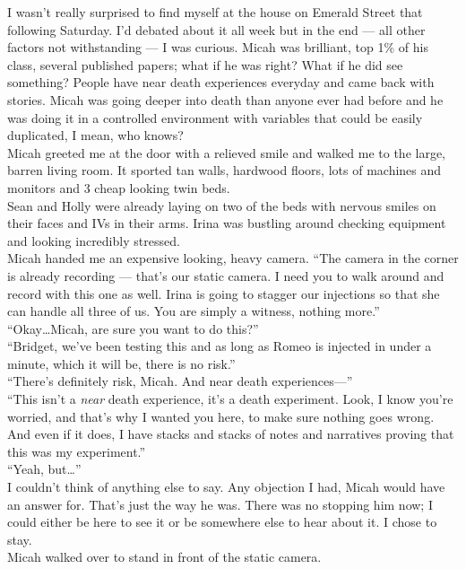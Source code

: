 \documentclass[a5paper]{scrartcl}
\begin{document}
I wasn't really surprised to find myself at the house on Emerald Street that following Saturday. I'd debated about it all week but in the end --- all other factors not withstanding --- I was curious. Micah was brilliant, top 1\% of his class, several published papers; what if he was right? What if he did see something? People have near death experiences everyday and came back with stories. Micah was going deeper into death than anyone ever had before and he was doing it in a controlled environment with variables that could be easily duplicated, I mean, who knows?\\
Micah greeted me at the door with a relieved smile and walked me to the large, barren living room. It sported tan walls, hardwood floors, lots of machines and monitors and 3 cheap looking twin beds.\\
Sean and Holly were already laying on two of the beds with nervous smiles on their faces and IVs in their arms. Irina was bustling around checking equipment and looking incredibly stressed.\\
Micah handed me an expensive looking, heavy camera. \enquote{The camera in the corner is already recording --- that's our static camera. I need you to walk around and record with this one as well. Irina is going to stagger our injections so that she can handle all three of us. You are simply a witness, nothing more.}\\
\enquote{Okay\dots Micah, are sure you want to do this?}\\
\enquote{Bridget, we've been testing this and as long as Romeo is injected in under a minute, which it will be, there is no risk.}\\
\enquote{There's definitely risk, Micah. And near death experiences---}\\
\enquote{This isn't a \textit{near} death experience, it's a death experiment. Look, I know you're worried, and that's why I wanted you here, to make sure nothing goes wrong. And even if it does, I have stacks and stacks of notes and narratives proving that this was my experiment.}\\
\enquote{Yeah, but\dots}\\
I couldn't think of anything else to say. Any objection I had, Micah would have an answer for. That's just the way he was. There was no stopping him now; I could either be here to see it or be somewhere else to hear about it. I chose to stay.\\
Micah walked over to stand in front of the static camera.\\
\end{document}
